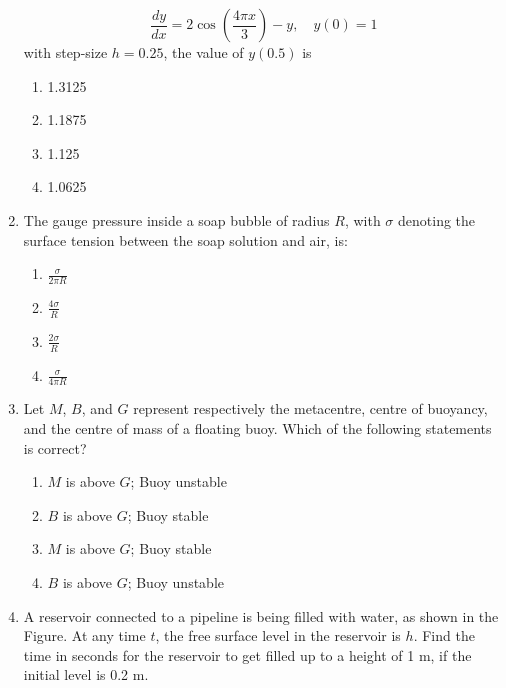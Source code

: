 \documentclass[journal]{IEEEtran}
\numberwithin{equation}{enumi}
\numberwithin{figure}{enumi}
\begin{document}
\begin{enumerate}
\[    \frac{dy}{dx} = 2 \cos \left( \frac{4 \pi x}{3} \right) - y, \quad y(0) = 1
    \]
    with step-size \( h = 0.25 \), the value of \( y(0.5) \) is
    \begin{multicols}{4}
    \begin{enumerate}
        \item 1.3125
        \item 1.1875
        \item 1.125
        \item 1.0625
    \end{enumerate}
    \end{multicols}
\bigskip    
    \item The gauge pressure inside a soap bubble of radius $R$, with $\sigma$ denoting the surface tension between the soap solution and air, is:
    \begin{multicols}{4}
    \begin{enumerate}
        \item $\frac{\sigma}{2 \pi R}$
        \item $\frac{4 \sigma}{R}$
        \item $\frac{2 \sigma}{R}$
        \item $\frac{\sigma}{4 \pi R}$
    \end{enumerate}
    \end{multicols}
\bigskip
    \item Let $M$, $B$, and $G$ represent respectively the metacentre, centre of buoyancy, and the centre of mass of a floating buoy. Which of the following statements is correct?
    \begin{multicols}{2}
    \begin{enumerate}
        \item $M$ is above $G$; Buoy unstable
        \item $B$ is above $G$; Buoy stable
        \item $M$ is above $G$; Buoy stable
        \item $B$ is above $G$; Buoy unstable
    \end{enumerate}
    \end{multicols}
\bigskip
    \item A reservoir connected to a pipeline is being filled with water, as shown in the Figure. At any time $t$, the free surface level in the reservoir is $h$. Find the time in seconds for the reservoir to get filled up to a height of 1 m, if the initial level is 0.2 m.
\begin{figure}[!ht]
    \centering
\end{figure}
\end{enumerate}
\end{document}
